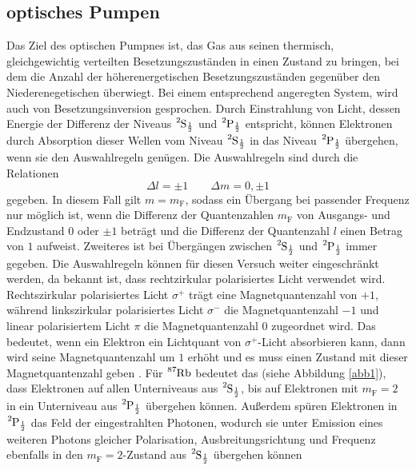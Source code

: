 \subsection{optisches Pumpen}

Das Ziel des optischen Pumpnes ist, das Gas aus seinen thermisch, gleichgewichtig
verteilten
Besetzungszuständen in einen Zustand zu bringen, bei dem die Anzahl der höherenergetischen 
Besetzungszuständen gegenüber den Niederenegetischen überwiegt. Bei einem 
entsprechend angeregten System, wird auch von Besetzungsinversion gesprochen.
Durch Einstrahlung von Licht, dessen Energie der Differenz der Niveaus 
$\ce{^{2}S_{\frac{1}{2}}}$ und $\ce{^{2}P_{\frac{1}{2}}}$ entspricht,
können Elektronen durch Absorption dieser Wellen vom Niveau 
$\ce{^{2}S_{\frac{1}{2}}}$ in das Niveau $\ce{^{2}P_{\frac{1}{2}}}$ übergehen,
wenn sie den Auswahlregeln genügen.
Die Auswahlregeln sind durch die Relationen
\begin{equation}
    \Delta l = \pm 1 \qquad \Delta m = 0, \pm1
\end{equation}
gegeben. In diesem Fall gilt $m = m_{\text{F}}$, sodass ein Übergang bei passender 
Frequenz nur möglich ist, wenn die Differenz der Quantenzahlen $m_{\text{F}}$ 
von Ausgangs- und Endzustand $0$ oder $\pm 1$ beträgt und die Differenz der 
Quantenzahl $l$ einen Betrag von $1$ aufweist. Zweiteres ist bei Übergängen zwischen 
$\ce{^{2}S_{\frac{1}{2}}}$ und $\ce{^{2}P_{\frac{1}{2}}}$ immer gegeben.
Die Auswahlregeln können für diesen Versuch weiter eingeschränkt werden, da bekannt ist,
dass rechtzirkular polarisiertes Licht verwendet wird. 
Rechtszirkular polarisiertes Licht $\sigma^+$ trägt eine Magnetquantenzahl von 
$+1$, während linkszirkular polarisiertes Licht $\sigma^-$ die Magnetquantenzahl 
$-1$ und linear polarisiertem Licht $\pi$ die Magnetquantenzahl $0$ zugeordnet wird.
Das bedeutet, wenn ein Elektron ein Lichtquant von $\sigma^+$-Licht absorbieren kann, 
dann wird seine Magnetquantenzahl um $1$ erhöht und es muss einen Zustand mit 
dieser Magnetquantenzahl geben \cite{1}. 
Für $\ce{^87Rb}$ bedeutet das (siehe Abbildung \ref{abb1}), dass Elektronen auf allen 
Unterniveaus aus $\ce{^{2}S_{\frac{1}{2}}}$, bis auf Elektronen mit $m_{\text{F}} = 2$
in ein Unterniveau aus $\ce{^{2}P_{\frac{1}{2}}}$ übergehen können.
Außerdem spüren Elektronen in $\ce{^{2}P_{\frac{1}{2}}}$ das Feld der 
eingestrahlten Photonen, wodurch sie unter Emission eines weiteren Photons gleicher 
Polarisation, Ausbreitungsrichtung und Frequenz ebenfalls in den 
$m_{\text{F}} = 2$-Zustand aus $\ce{^{2}S_{\frac{1}{2}}}$ übergehen können
